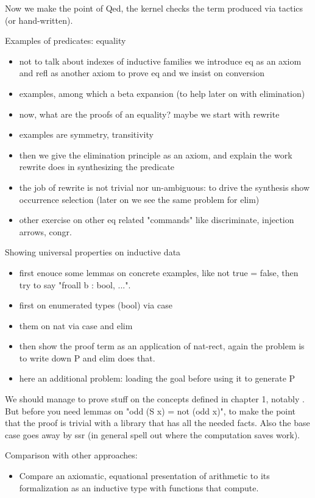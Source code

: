 Now we make the point of Qed, the kernel checks the term produced via
tactics (or hand-written).

Examples of predicates: equality
\begin{itemize}
\item not to talk about indexes of inductive families we introduce eq as
	an axiom and refl as another axiom to prove eq and we insist on
	conversion
\item examples, among which a beta expansion (to help later on with elimination)
\item now, what are the proofs of an equality? maybe we start with rewrite
\item examples are symmetry, transitivity
\item then we give the elimination principle as an axiom, and explain the
	work rewrite does in synthesizing the predicate
\item the job of rewrite is not trivial nor un-ambiguous: to drive the synthesis show occurrence selection (later on we see the same problem for elim)
\item other exercise on other eq related "commands" like discriminate, injection arrows, congr.
\end{itemize}

Showing universal properties on inductive data
\begin{itemize}
\item first enouce some lemmas on concrete examples, like not true = false,
	then try to say "froall b : bool, ...".
\item first on enumerated types (bool) via case
\item them on nat via case and elim
\item then show the proof term as an application of nat-rect, again the problem
	is to write down P and elim does that.
\item here an additional problem: loading the goal before using it to generate P
\end{itemize}

We should manage to prove stuff on the concepts defined in chapter 1,
notably .  But before you need lemmas
on "odd (S x) = not (odd x)", to make the point that the proof is trivial with
a library that has all the needed facts.  Also the base case goes away by ssr (in general spell out where the computation saves work).

Comparison with other approaches:
\begin{itemize}
\item Compare an axiomatic, equational presentation of arithmetic to
  its formalization as an inductive type with functions that
  compute.
\end{itemize}


